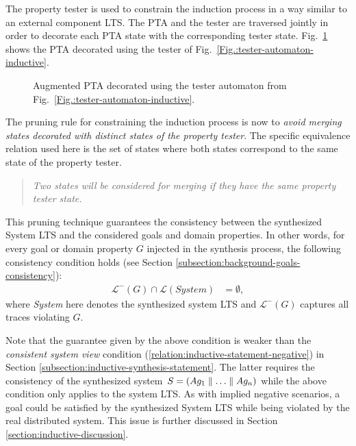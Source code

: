 The property tester is used to constrain the induction process in a way similar to an external component LTS. The PTA and the tester are traversed jointly in order to decorate each PTA state with the corresponding tester state. Fig.~\ref{Fig.:goal-unfolded-pta} shows the PTA decorated using the tester of Fig.~\ref{Fig.:tester-automaton-inductive}.

\begin{figure}
\centering
{}
\caption[Augmented PTA decorated using a tester automaton]{Augmented PTA decorated using the tester automaton from Fig.~\ref{Fig.:tester-automaton-inductive}\label{Fig.:goal-unfolded-pta}.}
\end{figure}

The pruning rule for constraining the induction process is now to \emph{avoid merging states decorated with distinct states of the property tester}. The specific equivalence relation used here is the set of states where both states correspond to the same state of the property tester. 
\begin{quote}
\emph{Two states will be considered for merging if they have the same property tester state.}
\end{quote}

This pruning technique guarantees the consistency between the synthesized System LTS and the considered goals and domain properties. In other words, for every goal or domain property $G$ injected in the synthesis process, the following consistency condition holds (see Section \ref{subsection:background-goals-consistency}):
\begin{align*}
\mathcal{L}^-(G) \cap \mathcal{L}(System) &= \emptyset,
\end{align*}
where \emph{System} here denotes the synthesized system LTS and $\mathcal{L}^-(G)$ captures all traces violating $G$.

Note that the guarantee given by the above condition is weaker than the \emph{consistent system view} condition (\ref{relation:inductive-statement-negative}) in Section \ref{subsection:inductive-synthesis-statement}. The latter requires the consistency of the synthesized system $S = (Ag_1 \parallel \ldots \parallel Ag_n)$ while the above condition only applies to the system LTS. As with implied negative scenarios, a goal could be satisfied by the synthesized System LTS while being violated by the real distributed system. This issue is further discussed in Section \ref{section:inductive-discussion}.

